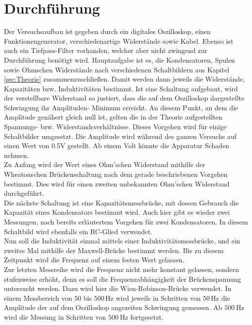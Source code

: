 \section{Durchführung}
\label{sec:Durchführung}
Der Versuchsaufbau ist gegeben durch ein digitales Oszilloskop, einen Funktionengenerator, verschiedenartige 
Widerstände sowie Kabel. Ebenso ist auch ein Tiefpass-Filter vorhanden, welcher aber nicht zwingend zur
Durchführung benötigt wird. Hauptaufgabe ist es, die Kondensatoren, Spulen sowie Ohmschen Widerstände
nach verschiedenen Schaltbildern aus Kapitel \ref{sec:Theorie} zusammenzuschließen. Damit werden dann jeweils die
Widerstände, Kapazitäten bzw. Induktivitäten bestimmt. Ist eine Schaltung aufgebaut, wird 
der verstellbare Widerstand so justiert, dass die auf dem Oszilloskop dargestellte Schwingung ihr Amplituden-
Minimum erreicht. An diesem Punkt, an dem die Amplitude genähert gleich null ist, gelten 
die in der Theorie aufgestellten Spannungs- bzw. Widerstandsverhältnisse. Dieses Vorgehen wird
für einige Schaltbilder umgesetzt. Die Amplitude wird während des ganzen Versuchs auf einen Wert von 0.5V gestellt.
Ab einem Volt könnte die Apparatur Schaden nehmen. \\ \noindent 
Zu Anfang wird der Wert eines Ohm'schen Widerstand mithilfe der 
Wheatonschen Brückenschaltung nach dem gerade beschriebenen Vorgehen bestimmt. Dies wird für einen
zweiten unbekannten Ohm'schen Widerstand durchgeführt.\\

Die nächste Schaltung ist eine Kapazitätsmessbrücke, mit dessen Gebrauch die Kapazität eines Kondensators
bestimmt wird. Auch hier gibt es wieder zwei Messungen, nach bereits erläutertem Vorgehen für zwei Kondensatoren.
In diesem Schaltbild wird ebenfalls ein RC-Glied verwendet.
\\
Nun soll die Induktivität einmal mittels einer Induktivitätsmessbrücke, und ein zweites Mal mithilfe der Maxwell-Brücke
bestimmt werden. Bis zu diesem Zeitpunkt wird die Frequenz auf einem festen Wert gelassen. 
\\
Zur letzten Messreihe wird die Frequenz nicht mehr konstant gelassen, sondern stufenweise erhöht, denn es soll die 
Frequenzabhängigkeit der Brückenspannung untersucht werden. Dazu wird hier die Wien-Robinson-Brücke 
verwendet. In einem Messbereich von $50$ bis $500$\,Hz wird jeweils in Schritten von $50$\,Hz die Amplitude der 
auf dem Oszilloskop angezeiten Schwingung gemessen. Ab $\qty{500}{\hertz}$ wird die Messung in Schritten von 
$\qty{500}{\hertz}$ fortgesetzt. 

